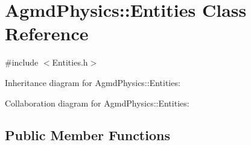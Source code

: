 \hypertarget{class_agmd_physics_1_1_entities}{\section{Agmd\+Physics\+:\+:Entities Class Reference}
\label{class_agmd_physics_1_1_entities}
}


{\ttfamily \#include $<$Entities.\+h$>$}



Inheritance diagram for Agmd\+Physics\+:\+:Entities\+:


Collaboration diagram for Agmd\+Physics\+:\+:Entities\+:
\subsection*{Public Member Functions}
